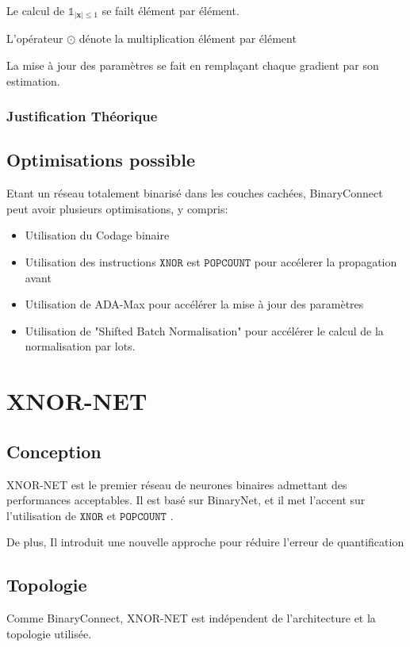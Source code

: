 \begin{remark}
	Le calcul de $\mathds{1}_{\lvert \boldsymbol{x} \rvert \leq 1}$ se failt élément par élément. 
\end{remark}
\begin{remark}
	L'opérateur $\odot$ dénote la multiplication élément par élément
\end{remark}

La mise à jour des paramètres se fait en remplaçant chaque gradient par son estimation.

\subsubsection{Justification Théorique}
\subsection{Optimisations possible}
Etant un réseau totalement binarisé dans les couches cachées, BinaryConnect peut avoir plusieurs optimisations, y compris:
\begin{itemize}
	\item Utilisation du Codage binaire
	\item Utilisation des instructions $\mathtt{XNOR}$ est $\mathtt{POPCOUNT}$ pour accélerer la propagation avant
	\item Utilisation de ADA-Max pour accélérer la mise à jour des paramètres
	\item Utilisation de "Shifted Batch Normalisation" pour accélérer le calcul de la normalisation par lots.
\end{itemize}
\newpage

\section{XNOR-NET}
\subsection{Conception}
XNOR-NET\cite{XnorNetPaper} est le premier réseau de neurones binaires admettant des performances acceptables. Il est basé sur BinaryNet, et il met  l'accent sur l'utilisation de $\mathtt{XNOR}$ et $\mathtt{POPCOUNT}$ \cite{XnorNetPaper}.

De plus, Il introduit une nouvelle approche pour réduire l'erreur de quantification



\subsection{Topologie}
Comme BinaryConnect, XNOR-NET\cite{XnorNetPaper} est indépendent de l'architecture et la topologie utilisée.


